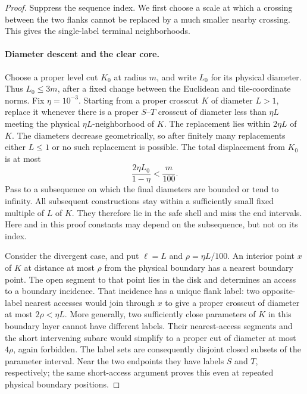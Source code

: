 \begin{proof}
Suppress the sequence index.  We first choose a scale at which a
crossing between the two flanks
cannot be replaced by a much smaller nearby crossing.  This gives the
single-label terminal neighborhoods.

\paragraph{Diameter descent and the clear core.}
Choose a proper level cut $K_0$ at radius $m$, and write $L_0$ for its
physical diameter.  Thus $L_0\le3m$, after a fixed change between the
Euclidean and tile-coordinate norms.  Fix $\eta=10^{-3}$.  Starting
from a proper crosscut $K$ of diameter $L>1$, replace it whenever there
is a proper $S$--$T$ crosscut of diameter less than $\eta L$ meeting
the physical $\eta L$-neighborhood of $K$.  The replacement lies within
$2\eta L$ of $K$.  The diameters decrease geometrically, so after
finitely many replacements either $L\le1$ or no such replacement is
possible.  The total displacement from $K_0$ is at most
\[
 \frac{2\eta L_0}{1-\eta}<\frac m{100}.
\]
Pass to a subsequence on which the final diameters are bounded or tend
to infinity.  All subsequent constructions stay within a sufficiently
small fixed multiple of $L$ of $K$.  They therefore lie in the safe
shell and miss the end intervals.  Here and in this proof constants
may depend on the subsequence, but not on its index.

Consider the divergent case, and put $\ell=L$ and
$\rho=\eta L/100$.  An interior point $x$ of $K$ at distance at most
$\rho$ from the physical boundary has a nearest boundary point.  The
open segment to that point lies in the disk and determines an access
to a boundary incidence.  That incidence has a unique flank label:
two opposite-label nearest accesses would join through $x$ to give
a proper crosscut of diameter at most $2\rho<\eta L$.  More generally,
two sufficiently close parameters of $K$ in this boundary layer cannot
have different labels.  Their nearest-access segments and the short
intervening subarc would simplify to a proper cut of diameter at most
$4\rho$, again forbidden.  The label sets are consequently disjoint
closed subsets of the parameter interval.  Near the two endpoints they
have labels $S$ and $T$, respectively; the same short-access argument
proves this even at repeated physical boundary positions.


\end{proof}
